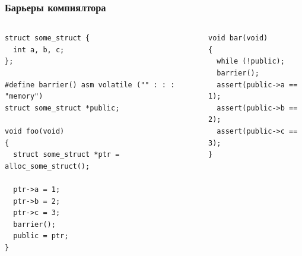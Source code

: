 \begin{frame}[fragile]
\frametitle{Барьеры компиялтора}

\begin{columns}[T]
  \begin{column}{.45\linewidth}
    \begin{lstlisting}
struct some_struct {
  int a, b, c;
};

#define barrier() asm volatile ("" : : : "memory")
struct some_struct *public;

void foo(void)
{
  struct some_struct *ptr = alloc_some_struct();

  ptr->a = 1;
  ptr->b = 2;
  ptr->c = 3;
  barrier();
  public = ptr;
}
    \end{lstlisting}
  \end{column}
  \begin{column}{.45\linewidth}
    \begin{lstlisting}
void bar(void)
{
  while (!public);
  barrier();
  assert(public->a == 1);
  assert(public->b == 2);
  assert(public->c == 3);
}
    \end{lstlisting}
  \end{column}
\end{columns}
\end{frame}

